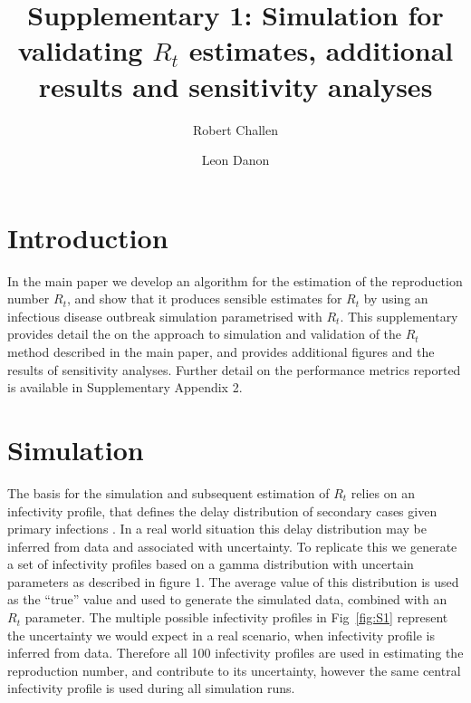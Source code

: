\documentclass[a4paper, 12pt, twoside]{article}
\title{Supplementary 1: Simulation for validating $R_t$ estimates, additional results and sensitivity analyses}
\author[1,2]{Robert Challen}
\author[1,2]{Leon Danon}
\affil[1]{AI4CI, University of Bristol, Bristol, UK.}
\affil[2]{Department of Engineering Mathematics, University of Bristol, Bristol, UK.}
\date{}                     %
\let\Oldsection\section
\renewcommand{\section}{\FloatBarrier\Oldsection}
\begin{document}
\maketitle

\section{Introduction}

In the main paper we develop an algorithm for the estimation of the reproduction number $R_t$, and show that it produces sensible estimates for $R_t$ by using an infectious disease outbreak simulation parametrised with $R_t$. This supplementary provides detail the on the approach to simulation and validation of the $R_t$ method described in the main paper, and provides additional figures and the results of sensitivity analyses. Further detail on the performance metrics reported is available in Supplementary Appendix 2.

\section{Simulation}

The basis for the simulation and subsequent estimation of $R_t$ relies on an infectivity profile, that defines the delay distribution of secondary cases given primary infections \cite{gostic2020,thompson2019}. In a real world situation this delay distribution may be inferred from data and associated with uncertainty. To replicate this we generate a set of infectivity profiles based on a gamma distribution with uncertain parameters as described in figure 1. The average value of this distribution is used as the ``true'' value and used to generate the simulated data, combined with an $R_t$ parameter. The multiple possible infectivity profiles in Fig~\ref{fig:S1} represent the uncertainty we would expect in a real scenario, when infectivity profile is inferred from data. Therefore all 100 infectivity profiles are used in estimating the reproduction number, and contribute to its uncertainty, however the same central infectivity profile is used during all simulation runs.
\end{document}
